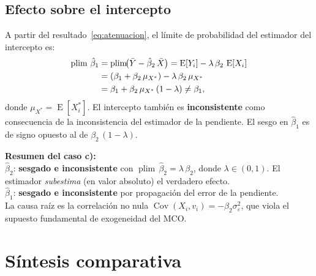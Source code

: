\documentclass[12pt, letterpaper]{article}
\newcommand{\plim}{\operatorname{plim}}
\newcommand{\Cov}{\operatorname{Cov}}
\newcommand{\E}{\operatorname{E}}
\begin{document}
\subsection{Efecto sobre el intercepto}

A partir del resultado~\eqref{eq:atenuacion}, el límite de probabilidad
del estimador del intercepto es:
\begin{align}
  \plim\,\hat{\beta}_1
    &= \plim\!\bigl(\bar{Y} - \hat{\beta}_2\,\bar{X}\bigr)
     = \E[Y_i] - \lambda\,\beta_2\,\E[X_i] \notag\\
    &= (\beta_1 + \beta_2\,\mu_{X^*}) - \lambda\,\beta_2\,\mu_{X^*} \notag\\
    &= \beta_1 + \beta_2\,\mu_{X^*}\,(1 - \lambda)
     \neq \beta_1,
\end{align}
donde $\mu_{X^*} = \E[X_i^*]$. El intercepto también es \textbf{inconsistente}
como consecuencia de la inconsistencia del estimador de la pendiente. El
sesgo en $\hat{\beta}_1$ es de signo opuesto al de $\beta_2\,(1-\lambda)$.

\begin{clave}
  \textbf{Resumen del caso c):}\\
  $\hat{\beta}_2$: \textbf{sesgado e inconsistente} con
  $\plim\,\hat{\beta}_2 = \lambda\,\beta_2$, donde $\lambda \in (0,1)$.
  El estimador \emph{subestima} (en valor absoluto) el verdadero efecto.\\
  $\hat{\beta}_1$: \textbf{sesgado e inconsistente} por propagación del
  error de la pendiente.\\
  La causa raíz es la correlación no nula $\Cov(X_i, v_i) = -\beta_2\sigma_\varepsilon^2$,
  que viola el supuesto fundamental de exogeneidad del MCO.
\end{clave}

\section{Síntesis comparativa}
\end{document}
